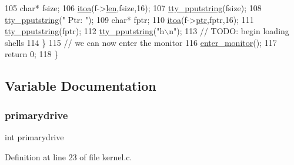 \begin{DoxyCode}
105         \textcolor{keywordtype}{char}* fsize;
106         \hyperlink{a00119_ab42640268f26e065efd044cfe80591bd_ab42640268f26e065efd044cfe80591bd}{itoa}(f->\hyperlink{a00310_a151dcc6387f9c9186b4b84526c3a89ff_a151dcc6387f9c9186b4b84526c3a89ff}{len},fsize,16);
107         \hyperlink{a00173_ade960b1320324706aac6c00cc6b1b2fe_ade960b1320324706aac6c00cc6b1b2fe}{tty\_pputstring}(fsize);
108         \hyperlink{a00173_ade960b1320324706aac6c00cc6b1b2fe_ade960b1320324706aac6c00cc6b1b2fe}{tty\_pputstring}(\textcolor{stringliteral}{" Ptr: "});
109         \textcolor{keywordtype}{char}* fptr;
110         \hyperlink{a00119_ab42640268f26e065efd044cfe80591bd_ab42640268f26e065efd044cfe80591bd}{itoa}(f->\hyperlink{a00310_ac769ba8a7086d818e1137ce59dd21077_ac769ba8a7086d818e1137ce59dd21077}{ptr},fptr,16);
111         \hyperlink{a00173_ade960b1320324706aac6c00cc6b1b2fe_ade960b1320324706aac6c00cc6b1b2fe}{tty\_pputstring}(fptr);
112         \hyperlink{a00173_ade960b1320324706aac6c00cc6b1b2fe_ade960b1320324706aac6c00cc6b1b2fe}{tty\_pputstring}(\textcolor{stringliteral}{"h\(\backslash\)n"});
113         \textcolor{comment}{// TODO: begin loading shells}
114     \}
115     \textcolor{comment}{// we can now enter the monitor}
116     \hyperlink{a00167_a33b77c779213ba5f7a0381c995a06f62_a33b77c779213ba5f7a0381c995a06f62}{enter\_monitor}();
117     \textcolor{keywordflow}{return} 0;
118 \}
\end{DoxyCode}


\subsection{Variable Documentation}
\mbox{\label{a00062_af37cb131d8a2101addfbf5fb2d8a53b4_af37cb131d8a2101addfbf5fb2d8a53b4}} 
\subsubsection{\texorpdfstring{primarydrive}{primarydrive}}
{\footnotesize\ttfamily int primarydrive}



Definition at line 23 of file kernel.\+c.

\mbox{\label{a00062_a2125beec541d04796805161dbec05fcf_a2125beec541d04796805161dbec05fcf}} 

